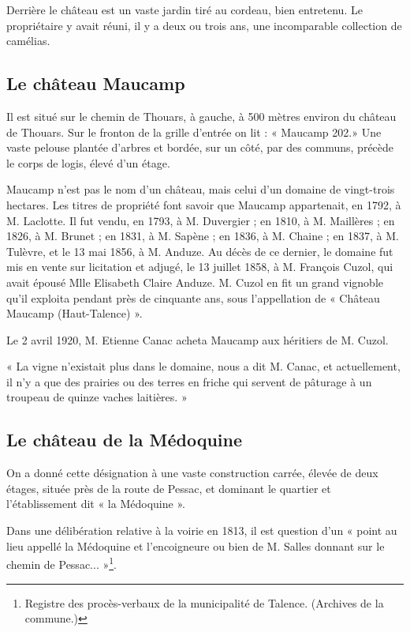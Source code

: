 Derrière le château est un vaste jardin tiré au cordeau, bien entretenu. Le propriétaire y avait réuni, il y a deux ou trois ans, une incomparable collection de camélias.

\subsection{Le château Maucamp}

Il est situé sur le chemin de Thouars, à gauche, à 500 mètres environ du château de Thouars. Sur le fronton de la grille d'entrée on lit : « Maucamp 202.» Une vaste pelouse plantée d'arbres et bordée, sur un côté, par des communs, précède le corps de logis, élevé d'un étage.

Maucamp n'est pas le nom d'un château, mais celui d'un domaine de vingt-trois hectares. Les titres de propriété font savoir que Maucamp appartenait, en 1792, à M. Laclotte. Il fut vendu, en 1793, à M. Duvergier ; en 1810, à M. Maillères ; en 1826, à M. Brunet ; en 1831, à M. Sapène ; en 1836, à M. Chaine ; en 1837, à M. Tulèvre, et le 13 mai 1856, à M. Anduze. Au décès de ce dernier, le domaine fut mis en vente sur licitation et adjugé, le 13 juillet 1858, à M. François Cuzol, qui avait épousé Mlle Elisabeth Claire Anduze. M. Cuzol en fit un grand vignoble qu'il exploita pendant près de cinquante ans, sous l'appellation de « Château Maucamp (Haut-Talence) ».

Le 2 avril 1920, M. Etienne Canac acheta Maucamp aux héritiers de M. Cuzol.

« La vigne n'existait plus dans le domaine, nous a dit M. Canac, et actuellement, il n'y a que des prairies ou des terres en friche qui servent de pâturage à un troupeau de quinze vaches laitières. »

\subsection{Le château de la Médoquine}

On a donné cette désignation à une vaste construction carrée, élevée de deux étages, située près de la route de Pessac, et dominant le quartier et l'établissement dit « la Médoquine ».

Dans une délibération relative à la voirie en 1813, il est question d'un « point au lieu appellé la Médoquine et l'encoigneure ou bien de M. Salles donnant sur le chemin de Pessac... »\footnote{Registre des procès-verbaux de la municipalité de Talence. (Archives de la commune.)}.

